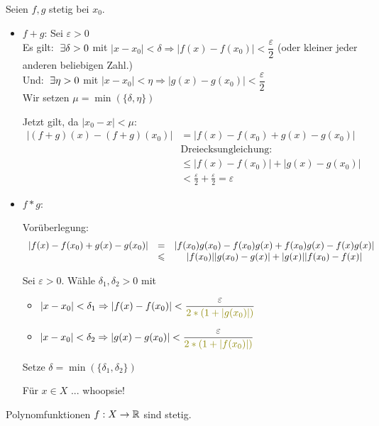 \documentclass[main.tex]{subfiles}
\begin{document}
\begin{Beweis}
  Seien $f,g$ stetig bei $x_0$.
  \begin{itemize}
    \item $f+g$: Sei $\varepsilon > 0$\\
    Es gilt: $\E \delta > 0$ mit $|x- x_0| < \delta \Rightarrow |f(x)-f(x_0)| < \dfrac{\varepsilon}{2}$ (oder kleiner jeder anderen beliebigen Zahl.)\\
    Und: $\E \eta > 0$ mit $|x- x_0| < \eta \Rightarrow |g(x)-g(x_0)| < \dfrac{\varepsilon}{2}$\\
    Wir setzen $\mu = \min(\{\delta, \eta\})$

    Jetzt gilt, da $|x_0 - x| < \mu$:
    $$\begin{aligned}
        |(f+g)(x) - (f+g)(x_0)| & = |f(x)-f(x_0)+g(x)-g(x_0)|\\
      & \text{Dreiecksungleichung:}\\
      & \leq |f(x)-f(x_0)|+|g(x)-g(x_0)| \\
      & < \frac{\varepsilon}{2} + \frac{\varepsilon}{2} = \varepsilon
    \end{aligned}$$
    \item $f*g$:

    Vorüberlegung:
    $$\begin{array}{c c c}
      |f(x)-f(x_0)+g(x)-g(x_0)| & = & |f(x_0)g(x_0) - f(x_0)g(x) + f(x_0)g(x) - f(x)g(x)|\\
      & \leq & |f(x_0)||g(x_0)-g(x)| + |g(x)||f(x_0)-f(x)|
    \end{array}$$

    Sei $\varepsilon > 0$. Wähle $\delta_1,\delta_2 > 0$ mit
    \begin{itemize}
      \item $|x-x_0| < \delta_1 \Rightarrow |f(x) -f(x_0)| < \dfrac{\varepsilon}{{\color{olive}2*(1+|g(x_0)|)}}$
      \item $|x-x_0| < \delta_2 \Rightarrow |g(x) -g(x_0)| < \dfrac{\varepsilon}{{\color{olive}2*(1+|f(x_0)|)}}$
    \end{itemize}
    Setze $\delta = \min (\{\delta_1,\delta_2\})$

    Für $x \in X$ ... whoopsie!
  \end{itemize}
\end{Beweis}

\begin{Korollar}
  Polynomfunktionen $f: X \to \R$ sind stetig.
\end{Korollar}
\end{document}
